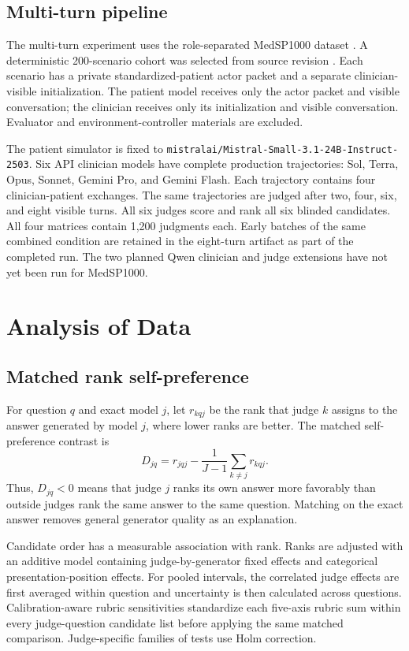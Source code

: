 \documentclass[11pt]{article}
\newcommand{\model}[1]{\texttt{#1}}
\begin{document}
\subsection{Multi-turn pipeline}

The multi-turn experiment uses the role-separated MedSP1000 dataset
\cite{liang2026}. A
deterministic 200-scenario cohort was selected from source
revision . Each scenario has a
private standardized-patient actor packet and a separate clinician-visible
initialization. The patient model receives only the actor packet and visible
conversation; the clinician receives only its initialization and visible
conversation. Evaluator and environment-controller materials are excluded.

The patient simulator is fixed to
\model{mistralai/Mistral-Small-3.1-24B-Instruct-2503}. Six API clinician models
have complete production trajectories: Sol, Terra, Opus, Sonnet, Gemini Pro,
and Gemini Flash. Each trajectory contains four clinician-patient exchanges.
The same trajectories are judged after two, four, six, and eight visible turns.
All six judges score and rank all six blinded candidates. All four matrices
contain 1,200 judgments each. Early batches of the same combined condition are
retained in the eight-turn artifact as part of the completed run. The two
planned Qwen clinician and judge extensions
have not yet been run for MedSP1000.

\section{Analysis of Data}
\subsection{Matched rank self-preference}

For question $q$ and exact model $j$, let $r_{kqj}$ be the rank that judge $k$
assigns to the answer generated by model $j$, where lower ranks are better. The
matched self-preference contrast is
\begin{equation}
D_{jq}=r_{jqj}-\frac{1}{J-1}\sum_{k\ne j}r_{kqj}.
\end{equation}
Thus, $D_{jq}<0$ means that judge $j$ ranks its own answer more favorably than
outside judges rank the same answer to the same question. Matching on the exact
answer removes general generator quality as an explanation.

Candidate order has a measurable association with rank. Ranks are adjusted
with an additive model containing judge-by-generator fixed effects and
categorical presentation-position effects. For pooled intervals, the
correlated judge effects are first averaged within question and uncertainty is
then calculated across questions. Calibration-aware rubric sensitivities
standardize each five-axis rubric sum within every judge-question candidate
list before applying the same matched comparison. Judge-specific families of
tests use Holm correction.
\end{document}
